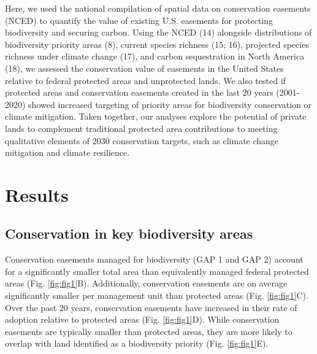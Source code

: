 \documentclass[3p]{elsarticle} %
\begin{document}
Here, we used the national compilation of spatial data on conservation
easements (NCED) to quantify the value of existing U.S. easements for
protecting biodiversity and securing carbon. Using the NCED (14)
alongside distributions of biodiversity priority areas (8), current
species richness (15; 16), projected species richness under climate
change (17), and carbon sequestration in North America (18), we assessed
the conservation value of easements in the United States relative to
federal protected areas and unprotected lands. We also tested if
protected areas and conservation easements created in the last 20 years
(2001-2020) showed increased targeting of priority areas for
biodiversity conservation or climate mitigation. Taken together, our
analyses explore the potential of private lands to complement
traditional protected area contributions to meeting qualitative elements
of 2030 conservation targets, such as climate change mitigation and
climate resilience.

\hypertarget{results}{%
\section{Results}\label{results}}

\hypertarget{conservation-in-key-biodiversity-areas}{%
\subsection{Conservation in key biodiversity
areas}\label{conservation-in-key-biodiversity-areas}}

Conservation easements managed for biodiversity (GAP 1 and GAP 2)
account for a significantly smaller total area than equivalently managed
federal protected areas (Fig. \ref{fig:fig1}B). Additionally,
conservation easements are on average significantly smaller per
management unit than protected areas (Fig. \ref{fig:fig1}C). Over the
past 20 years, conservation easements have increased in their rate of
adoption relative to protected areas (Fig. \ref{fig:fig1}D). While
conservation easements are typically smaller than protected areas, they
are more likely to overlap with land identified as a biodiversity
priority (Fig. \ref{fig:fig1}E).
\end{document}
